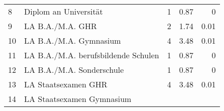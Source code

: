 \begin{longtable}{lXrrr}
     8 &
     \multicolumn{1}{X}{ Diplom an Universität   } &


       \num{1} &
       \num[round-mode=places,round-precision=2]{0.87} &
         \num[round-mode=places,round-precision=2]{0} \\

     9 &
     \multicolumn{1}{X}{ LA B.A./M.A. GHR   } &


       \num{2} &
       \num[round-mode=places,round-precision=2]{1.74} &
         \num[round-mode=places,round-precision=2]{0.01} \\

     10 &
     \multicolumn{1}{X}{ LA B.A./M.A. Gymnasium   } &


       \num{4} &
       \num[round-mode=places,round-precision=2]{3.48} &
         \num[round-mode=places,round-precision=2]{0.01} \\

     11 &
     \multicolumn{1}{X}{ LA B.A./M.A. berufsbildende Schulen   } &


       \num{1} &
       \num[round-mode=places,round-precision=2]{0.87} &
         \num[round-mode=places,round-precision=2]{0} \\

     12 &
     \multicolumn{1}{X}{ LA B.A./M.A. Sonderschule   } &


       \num{1} &
       \num[round-mode=places,round-precision=2]{0.87} &
         \num[round-mode=places,round-precision=2]{0} \\

     13 &
     \multicolumn{1}{X}{ LA Staatsexamen GHR   } &


       \num{4} &
       \num[round-mode=places,round-precision=2]{3.48} &
         \num[round-mode=places,round-precision=2]{0.01} \\

     14 &
     \multicolumn{1}{X}{ LA Staatsexamen Gymnasium   } &



\end{longtable}
